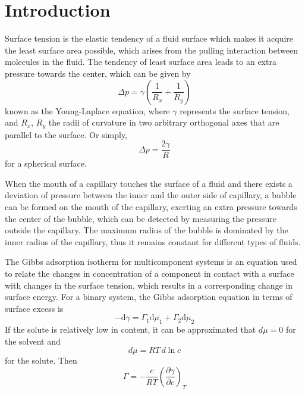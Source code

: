 \documentclass[%
 reprint,
 amsmath,amssymb,
 aps,
10.5pt,
]{revtex4-1}
\begin{document}
\tableofcontents

\section{Introduction}
Surface tension is the elastic tendency of a fluid surface which makes it acquire the least surface area possible, which arises from the pulling interaction between molecules in the fluid. The tendency of least surface area leads to an extra pressure towards the center, which can be given by
\begin{equation}
\Delta p = \gamma (\frac{1}{R_x}+\frac{1}{R_y})
\end{equation}
known as the Young-Laplace equation, where $\gamma$ represents the surface tension, and $R_x,\,R_y$ the radii of curvature in two arbitrary orthogonal axes that are parallel to the surface. Or simply,
\begin{equation}
\Delta p = \frac{2 \gamma}{R}
\end{equation}
for a spherical surface. 

When the mouth of a capillary touches the surface of a fluid and there exists a deviation of pressure between the inner and the outer side of capillary, a bubble can be formed on the mouth of the capillary, exerting an extra pressure towards the center of the bubble, which can be detected by measuring the pressure outside the capillary. The maximum radius of the bubble is dominated by the inner radius of the capillary, thus it remains constant for different types of fluids.

The Gibbs adsorption isotherm for multicomponent systems is an equation used to relate the changes in concentration of a component in contact with a surface with changes in the surface tension, which results in a corresponding change in surface energy. For a binary system, the Gibbs adsorption equation in terms of surface excess is 
\begin{equation}
- \mathrm { d } \gamma = \Gamma _ { 1 } \mathrm { d } \mu _ { 1 } + \Gamma _ { 2 } \mathrm { d } \mu _ { 2 }
\end{equation}
If the solute is relatively low in content, it can be approximated that $d\mu =0$ for the solvent and 
\begin{equation}
d \mu = RT \,d\ln c
\end{equation}
for the solute. Then
\begin{equation}
\Gamma = - \frac{c}{RT} \left(\frac{\partial \gamma}{\partial c}\right)_T
\end{equation}
\end{document}
